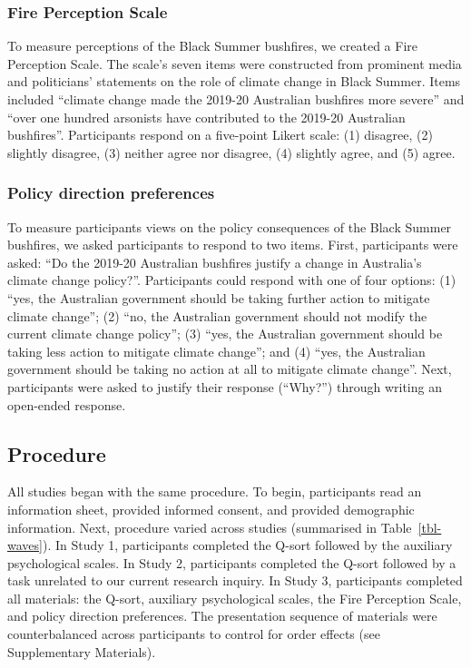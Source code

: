 \documentclass[
  letterpaper,
  DIV=11,
  numbers=noendperiod]{scrartcl}
\begin{document}
\hypertarget{fire-perception-scale}{%
\subsubsection{Fire Perception Scale}\label{fire-perception-scale}}

To measure perceptions of the Black Summer bushfires, we created a Fire
Perception Scale. The scale's seven items were constructed from
prominent media and politicians' statements on the role of climate
change in Black Summer. Items included ``climate change made the 2019-20
Australian bushfires more severe'' and ``over one hundred arsonists have
contributed to the 2019-20 Australian bushfires''. Participants respond
on a five-point Likert scale: (1) disagree, (2) slightly disagree, (3)
neither agree nor disagree, (4) slightly agree, and (5) agree.

\hypertarget{policy-direction-preferences}{%
\subsubsection{Policy direction
preferences}\label{policy-direction-preferences}}

To measure participants views on the policy consequences of the Black
Summer bushfires, we asked participants to respond to two items. First,
participants were asked: ``Do the 2019-20 Australian bushfires justify a
change in Australia's climate change policy?''. Participants could
respond with one of four options: (1) ``yes, the Australian government
should be taking further action to mitigate climate change''; (2) ``no,
the Australian government should not modify the current climate change
policy''; (3) ``yes, the Australian government should be taking less
action to mitigate climate change''; and (4) ``yes, the Australian
government should be taking no action at all to mitigate climate
change''. Next, participants were asked to justify their response
(``Why?'') through writing an open-ended response.

\hypertarget{procedure}{%
\subsection{Procedure}\label{procedure}}

All studies began with the same procedure. To begin, participants read
an information sheet, provided informed consent, and provided
demographic information. Next, procedure varied across studies
(summarised in Table~\ref{tbl-waves}). In Study 1, participants
completed the Q-sort followed by the auxiliary psychological scales. In
Study 2, participants completed the Q-sort followed by a task unrelated
to our current research inquiry. In Study 3, participants completed all
materials: the Q-sort, auxiliary psychological scales, the Fire
Perception Scale, and policy direction preferences. The presentation
sequence of materials were counterbalanced across participants to
control for order effects (see Supplementary Materials).
\end{document}

